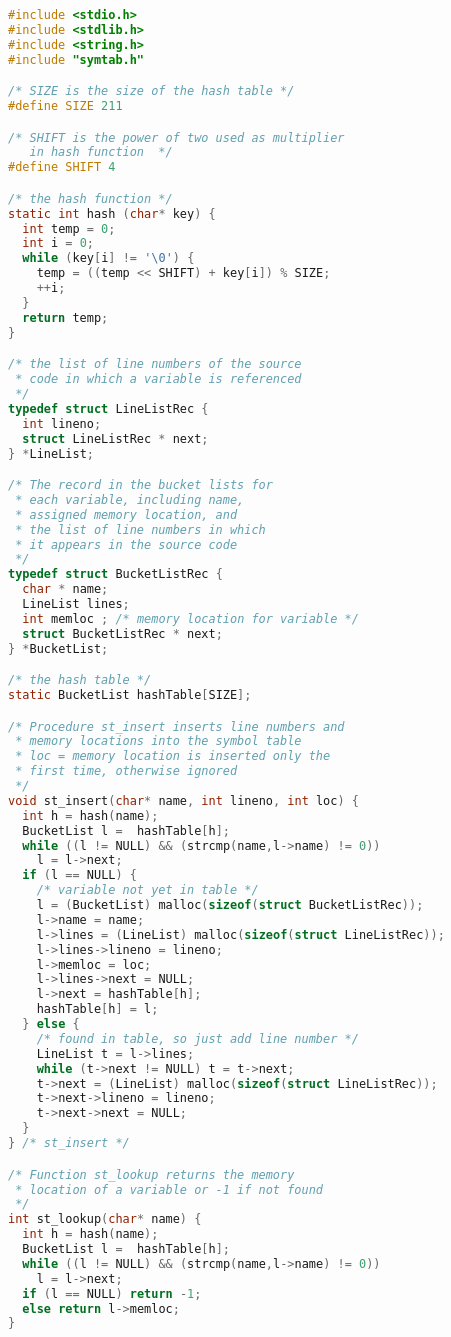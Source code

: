 \documentclass[lang=cn,10pt]{elegantbook}
\begin{document}
\begin{lstlisting}[caption={symtab.c},language=c]
#include <stdio.h>
#include <stdlib.h>
#include <string.h>
#include "symtab.h"

/* SIZE is the size of the hash table */
#define SIZE 211

/* SHIFT is the power of two used as multiplier
   in hash function  */
#define SHIFT 4

/* the hash function */
static int hash (char* key) {
  int temp = 0;
  int i = 0;
  while (key[i] != '\0') {
    temp = ((temp << SHIFT) + key[i]) % SIZE;
    ++i;
  }
  return temp;
}

/* the list of line numbers of the source 
 * code in which a variable is referenced
 */
typedef struct LineListRec {
  int lineno;
  struct LineListRec * next;
} *LineList;

/* The record in the bucket lists for
 * each variable, including name, 
 * assigned memory location, and
 * the list of line numbers in which
 * it appears in the source code
 */
typedef struct BucketListRec {
  char * name;
  LineList lines;
  int memloc ; /* memory location for variable */
  struct BucketListRec * next;
} *BucketList;

/* the hash table */
static BucketList hashTable[SIZE];

/* Procedure st_insert inserts line numbers and
 * memory locations into the symbol table
 * loc = memory location is inserted only the
 * first time, otherwise ignored
 */
void st_insert(char* name, int lineno, int loc) {
  int h = hash(name);
  BucketList l =  hashTable[h];
  while ((l != NULL) && (strcmp(name,l->name) != 0))
    l = l->next;
  if (l == NULL) {
    /* variable not yet in table */
    l = (BucketList) malloc(sizeof(struct BucketListRec));
    l->name = name;
    l->lines = (LineList) malloc(sizeof(struct LineListRec));
    l->lines->lineno = lineno;
    l->memloc = loc;
    l->lines->next = NULL;
    l->next = hashTable[h];
    hashTable[h] = l;
  } else {
    /* found in table, so just add line number */
    LineList t = l->lines;
    while (t->next != NULL) t = t->next;
    t->next = (LineList) malloc(sizeof(struct LineListRec));
    t->next->lineno = lineno;
    t->next->next = NULL;
  }
} /* st_insert */

/* Function st_lookup returns the memory 
 * location of a variable or -1 if not found
 */
int st_lookup(char* name) {
  int h = hash(name);
  BucketList l =  hashTable[h];
  while ((l != NULL) && (strcmp(name,l->name) != 0))
    l = l->next;
  if (l == NULL) return -1;
  else return l->memloc;
}


\end{lstlisting}
\end{document}
